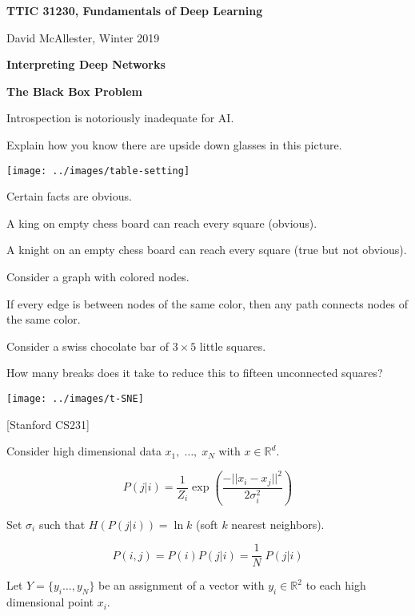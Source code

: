 





{\Huge

  \centerline{\bf TTIC 31230, Fundamentals of Deep Learning}
  \bigskip
  \centerline{David McAllester, Winter 2019}
  \vfill
  \centerline{\bf Interpreting Deep Networks}
  \vfill
  \centerline{\bf The Black Box Problem}
  \vfill  
  \vfill


Introspection is notoriously inadequate for AI.

\vfill
Explain how you know there are upside down glasses in this picture.
\vfill
\centerline{\texttt{[image: ../images/table-setting]}}


Certain facts are obvious.

\vfill
A king on empty chess board can reach every square (obvious).

\vfill
A knight on an empty chess board can reach every square (true but not obvious).


Consider a graph with colored nodes.

\vfill
If every edge is between nodes of the same color, then any path connects nodes of the same color.

\vfill
Consider a swiss chocolate bar of $3 \times 5$ little squares.

\vfill
How many breaks does it take to reduce this to fifteen unconnected squares?


\centerline{\texttt{[image: ../images/t-SNE]}}
\centerline{[Stanford CS231]}

Consider high dimensional data $x_1,\;\ldots,\;x_N$ with $x \in \mathbb{R}^d$.

\vfill
$$P(j|i) = \frac{1}{Z_i} \exp\left(\frac{-||x_i -x_j||^2}{2\sigma_i^2}\right)$$

\vfill
Set $\sigma_i$ such that $H(P(j|i)) = \ln k$ (soft $k$ nearest neighbors).

\vfill
$$P(i,j) = P(i)P(j|i) = \frac{1}{N}\;P(j|i)$$

Let $Y = \{y_i\ldots,y_N\}$ be an assignment of a vector with $y_i \in \mathbb{R}^2$ to each high dimensional point $x_i$.

}
